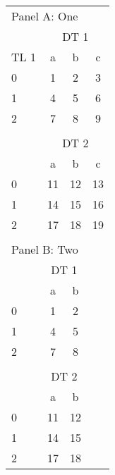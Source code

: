 \begin{table}
\centering
\begin{threeparttable}
\caption{}
\begin{tabular}{lccc}
\toprule
\multicolumn{4}{l}{Panel A: One}\\
  & \multicolumn{3}{c}{DT 1}\\
\cmidrule(lr){2-4}
TL 1 & a & b & c\\
0 & 1 & 2 & 3 \\
1 & 4 & 5 & 6 \\
2 & 7 & 8 & 9 \\
  &   &   &  \\
  & \multicolumn{3}{c}{DT 2}\\
\cmidrule(lr){2-4}
  & a & b & c\\
0 & 11 & 12 & 13 \\
1 & 14 & 15 & 16 \\
2 & 17 & 18 & 19 \\
  &   &   &  \\
\multicolumn{3}{l}{Panel B: Two}\\
  & \multicolumn{2}{c}{DT 1} &  \\
\cmidrule(lr){2-3}
  & a & b &  \\
0 & 1 & 2  &  \\
1 & 4 & 5  &  \\
2 & 7 & 8  &  \\
  &   &   &  \\
  & \multicolumn{2}{c}{DT 2} &  \\
\cmidrule(lr){2-3}
  & a & b &  \\
0 & 11 & 12  &  \\
1 & 14 & 15  &  \\
2 & 17 & 18  &  \\
\bottomrule

\end{tabular}
\end{threeparttable}
\end{table}